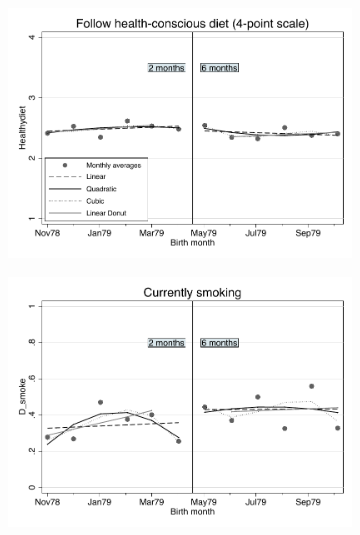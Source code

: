 \documentclass[a4paper ]{article}
\begin{document}
\newpage
\begin{figure}[p]
\begin{subfigure}[h]{0.48\textwidth}\centering
	\includegraphics[width=\textwidth]{../../analysis/graphs/SOEP/Healthydiet_RD.pdf}
\end{subfigure}
\quad
\begin{subfigure}[h]{0.48\textwidth}\centering
	\includegraphics[width=\textwidth]{../../analysis/graphs/SOEP/D_smoke_RD.pdf}
\end{subfigure}


\end{figure}
\end{document}
